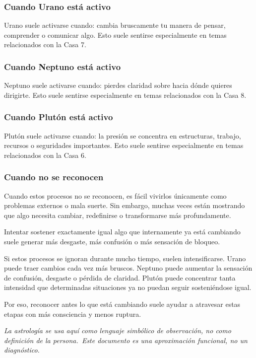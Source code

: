 \documentclass[11pt,a4paper]{article}
\begin{document}
\subsubsection*{Cuando Urano está activo}
Urano suele activarse cuando: cambia bruscamente tu manera de pensar, comprender o comunicar algo. Esto suele sentirse especialmente en temas relacionados con la Casa 7.

\subsubsection*{Cuando Neptuno está activo}
Neptuno suele activarse cuando: pierdes claridad sobre hacia dónde quieres dirigirte. Esto suele sentirse especialmente en temas relacionados con la Casa 8.

\subsubsection*{Cuando Plutón está activo}
Plutón suele activarse cuando: la presión se concentra en estructuras, trabajo, recursos o seguridades importantes. Esto suele sentirse especialmente en temas relacionados con la Casa 6.

\subsubsection*{Cuando no se reconocen}
Cuando estos procesos no se reconocen, es fácil vivirlos únicamente como problemas externos o mala suerte. Sin embargo, muchas veces están mostrando que algo necesita cambiar, redefinirse o transformarse más profundamente.

Intentar sostener exactamente igual algo que internamente ya está cambiando suele generar más desgaste, más confusión o más sensación de bloqueo.

\vspace{0.6cm}
Si estos procesos se ignoran durante mucho tiempo, suelen intensificarse. Urano puede traer cambios cada vez más bruscos. Neptuno puede aumentar la sensación de confusión, desgaste o pérdida de claridad. Plutón puede concentrar tanta intensidad que determinadas situaciones ya no puedan seguir sosteniéndose igual.

Por eso, reconocer antes lo que está cambiando suele ayudar a atravesar estas etapas con más consciencia y menos ruptura.

\vspace{1cm}
\begin{center}
{\small\itshape\color{grisai}
La astrología se usa aquí como lenguaje simbólico de observación, no como definición de la persona.\
Este documento es una aproximación funcional, no un diagnóstico.
}
\end{center}
\end{document}

